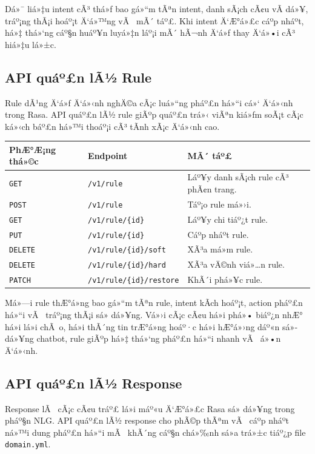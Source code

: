 ﻿\documentclass[12pt,a4paper]{report}
\begin{document}
Dá»¯ liá»‡u intent cÃ³ thá»ƒ bao gá»“m tÃªn intent, danh sÃ¡ch cÃ¢u vÃ­ dá»¥, tráº¡ng thÃ¡i hoáº¡t Ä‘á»™ng vÃ  mÃ´ táº£. Khi intent Ä‘Æ°á»£c cáº­p nháº­t, há»‡ thá»‘ng cáº§n huáº¥n luyá»‡n láº¡i mÃ´ hÃ¬nh Ä‘á»ƒ thay Ä‘á»•i cÃ³ hiá»‡u lá»±c.

\subsection{API quáº£n lÃ½ Rule}

Rule dÃ¹ng Ä‘á»ƒ Ä‘á»‹nh nghÄ©a cÃ¡c luá»“ng pháº£n há»“i cá»‘ Ä‘á»‹nh trong Rasa. API quáº£n lÃ½ rule giÃºp quáº£n trá»‹ viÃªn kiá»ƒm soÃ¡t cÃ¡c ká»‹ch báº£n há»™i thoáº¡i cÃ³ tÃ­nh xÃ¡c Ä‘á»‹nh cao.

\begin{longtable}{|p{3cm}|p{5cm}|p{7cm}|}
\hline
\textbf{PhÆ°Æ¡ng thá»©c} & \textbf{Endpoint} & \textbf{MÃ´ táº£} \\
\hline
\texttt{GET} & \texttt{/v1/rule} & Láº¥y danh sÃ¡ch rule cÃ³ phÃ¢n trang. \\
\hline
\texttt{POST} & \texttt{/v1/rule} & Táº¡o rule má»›i. \\
\hline
\texttt{GET} & \texttt{/v1/rule/\{id\}} & Láº¥y chi tiáº¿t rule. \\
\hline
\texttt{PUT} & \texttt{/v1/rule/\{id\}} & Cáº­p nháº­t rule. \\
\hline
\texttt{DELETE} & \texttt{/v1/rule/\{id\}/soft} & XÃ³a má»m rule. \\
\hline
\texttt{DELETE} & \texttt{/v1/rule/\{id\}/hard} & XÃ³a vÄ©nh viá»…n rule. \\
\hline
\texttt{PATCH} & \texttt{/v1/rule/\{id\}/restore} & KhÃ´i phá»¥c rule. \\
\hline
\end{longtable}

Má»—i rule thÆ°á»ng bao gá»“m tÃªn rule, intent kÃ­ch hoáº¡t, action pháº£n há»“i vÃ  tráº¡ng thÃ¡i sá»­ dá»¥ng. Vá»›i cÃ¡c cÃ¢u há»i phá»• biáº¿n nhÆ° há»i lá»i chÃ o, há»i thÃ´ng tin trÆ°á»ng hoáº·c há»i hÆ°á»›ng dáº«n sá»­ dá»¥ng chatbot, rule giÃºp há»‡ thá»‘ng pháº£n há»“i nhanh vÃ  á»•n Ä‘á»‹nh.

\subsection{API quáº£n lÃ½ Response}

Response lÃ  cÃ¡c cÃ¢u tráº£ lá»i máº«u Ä‘Æ°á»£c Rasa sá»­ dá»¥ng trong pháº§n NLG. API quáº£n lÃ½ response cho phÃ©p thÃªm vÃ  cáº­p nháº­t ná»™i dung pháº£n há»“i mÃ  khÃ´ng cáº§n chá»‰nh sá»­a trá»±c tiáº¿p file \texttt{domain.yml}.
\end{document}
